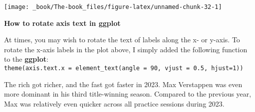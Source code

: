 \documentclass[
]{book}
\begin{document}
\begin{center}\texttt{[image: \_book/The-book\_files/figure-latex/unnamed-chunk-32-1]} \end{center}

\begin{blackbox}

\begin{center}
\textbf{How to rotate axis text in ggplot}

\end{center}

At times, you may wish to rotate the text of labels along the x- or y-axis. To rotate the x-axis labels in the plot above, I simply added the following function to the \textbf{ggplot}: \texttt{theme(axis.text.x\ =\ element\_text(angle\ =\ 90,\ vjust\ =\ 0.5,\ hjust=1))}

\end{blackbox}

The rich got richer, and the fast got faster in 2023. Max Verstappen was even more dominant in his third title-winning season. Compared to the previous year, Max was relatively even quicker across all practice sessions during 2023.
\end{document}
